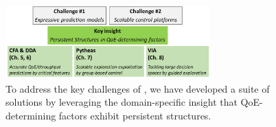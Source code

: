 
\begin{figure}[t!]
\centering
\includegraphics[width=0.7\textwidth]{figures/intro-contribution.pdf}
\caption{To address the key challenges
of \ddn, we have developed a suite of solutions by leveraging the domain-specific 
insight that QoE-determining factors
exhibit persistent structures.}
\label{fig:intro-contribution}
\end{figure}

